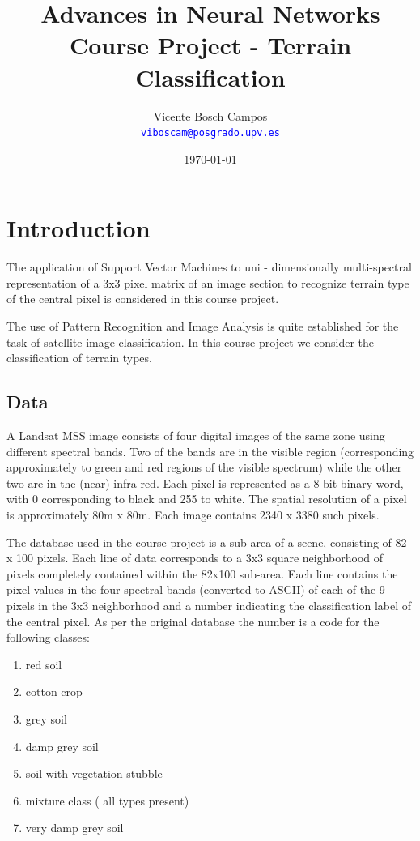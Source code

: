 \documentclass[a4paper,10pt,titlepage]{article}
\title{Advances in Neural Networks \\ Course Project - Terrain Classification}
\author{Vicente Bosch Campos \dag \\
\textcolor{blue}{\texttt{viboscam@posgrado.upv.es}}}
\date{\today}
\begin{document}
\ifpdf
{}
\else
{}
\fi

\maketitle

\tableofcontents

\listoffigures

\section{Introduction}

\par The application of Support Vector Machines to uni - dimensionally multi-spectral representation of a 3x3 pixel matrix of an image section to recognize terrain type of the central pixel is considered in this course project.
\\
\par The use of Pattern Recognition and Image Analysis is quite established for the task of satellite image classification. In this course project we consider the classification of terrain types.


\subsection{Data}

\par A Landsat MSS image consists of four digital images of the same zone using different spectral bands. Two of the bands are in the visible region (corresponding approximately to green and red regions of the visible spectrum) while the other two are in the (near) infra-red. Each pixel is represented as a 8-bit binary word, with 0 corresponding to black and 255 to white. The spatial resolution of a pixel is approximately 80m x 80m. Each image contains 2340 x 3380 such pixels.
\\
\par The database used in the course project is a sub-area of a scene, consisting of 82 x 100 pixels. Each line of data corresponds to a 3x3 square neighborhood of pixels completely contained within the 82x100 sub-area. Each line contains the pixel values in the four spectral bands (converted to ASCII) of each of the 9 pixels in the 3x3 neighborhood and a number indicating the classification label of the central pixel. As per the original database the number is a code for the following classes:
\begin{enumerate}
	\item red soil
	\item cotton crop
	\item grey soil
	\item damp grey soil
	\item soil with vegetation stubble
	\item mixture class ( all types present)
	\item very damp grey soil
\end{enumerate}
\end{document}
